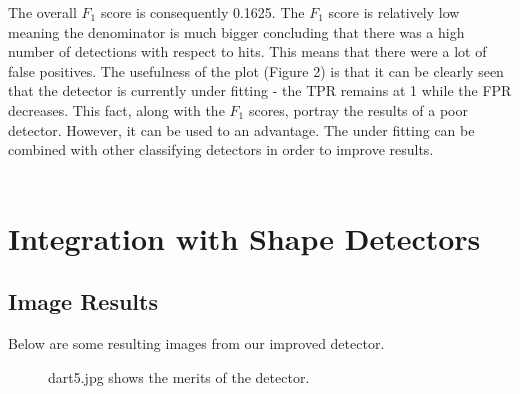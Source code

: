 \documentclass[a4paper]{article}
\begin{document}
The overall \(F_{1}\) score is consequently 0.1625. The \(F_{1}\) score is
relatively low meaning the denominator is much bigger concluding that there was
a high number of detections with respect to hits. This means that there were a
lot of false positives. The usefulness of the plot (Figure 2) is that it can be
clearly seen that the detector is currently under fitting - the TPR remains at
1 while the FPR decreases. This fact, along with the \(F_{1}\) scores, portray
the results of a poor detector. However, it can be used to an advantage. The
under fitting can be combined with other classifying detectors in order to
improve results.
\\\\

\section*{Integration with Shape Detectors}
\subsection*{Image Results}
Below are some resulting images from our improved detector.


\vspace{-2em}
\begin{figure}[H]
  \centering
  \hfill
   \hfill
   \hfill
   \caption{dart5.jpg shows the merits of the detector.}
\end{figure}
\vspace{-2.5em}
\end{document}
